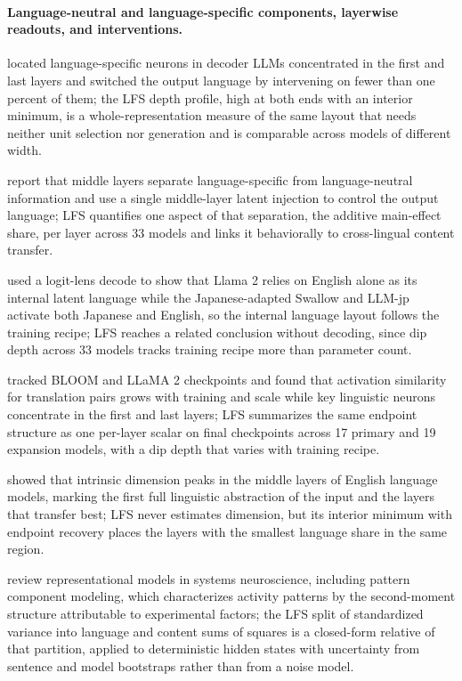 \documentclass{article} %
\begin{document}
\paragraph{Language-neutral and language-specific components, layerwise readouts, and interventions.}
\citet{kojima2024neurons} located language-specific neurons in decoder LLMs concentrated in the first and last layers and switched the output language by intervening on fewer than one percent of them; the LFS depth profile, high at both ends with an interior minimum, is a whole-representation measure of the same layout that needs neither unit selection nor generation and is comparable across models of different width.

\citet{lopo2025surgery} report that middle layers separate language-specific from language-neutral information and use a single middle-layer latent injection to control the output language; LFS quantifies one aspect of that separation, the additive main-effect share, per layer across 33 models and links it behaviorally to cross-lingual content transfer.

\citet{zhong2025think} used a logit-lens decode to show that Llama 2 relies on English alone as its internal latent language while the Japanese-adapted Swallow and LLM-jp activate both Japanese and English, so the internal language layout follows the training recipe; LFS reaches a related conclusion without decoding, since dip depth across 33 models tracks training recipe more than parameter count.

\citet{zeng2025converging} tracked BLOOM and LLaMA 2 checkpoints and found that activation similarity for translation pairs grows with training and scale while key linguistic neurons concentrate in the first and last layers; LFS summarizes the same endpoint structure as one per-layer scalar on final checkpoints across 17 primary and 19 expansion models, with a dip depth that varies with training recipe.

\citet{cheng2025abstraction} showed that intrinsic dimension peaks in the middle layers of English language models, marking the first full linguistic abstraction of the input and the layers that transfer best; LFS never estimates dimension, but its interior minimum with endpoint recovery places the layers with the smallest language share in the same region.

\citet{kriegeskorte2019onion} review representational models in systems neuroscience, including pattern component modeling, which characterizes activity patterns by the second-moment structure attributable to experimental factors; the LFS split of standardized variance into language and content sums of squares is a closed-form relative of that partition, applied to deterministic hidden states with uncertainty from sentence and model bootstraps rather than from a noise model.
\end{document}
